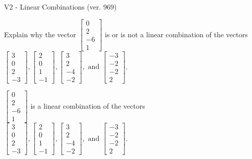\begin{exercise}
  \begin{exerciseTitle}V2 - Linear Combinations (ver. 969)\end{exerciseTitle}
  \begin{exerciseStatement}
    Explain why the vector \(\left[\begin{array}{c}
0 \\
2 \\
-6 \\
1
\end{array}\right]\)  is or is not a linear 
	combination of the vectors \(\left[\begin{array}{c}
3 \\
0 \\
2 \\
-3
\end{array}\right] , \left[\begin{array}{c}
2 \\
0 \\
1 \\
-1
\end{array}\right] , \left[\begin{array}{c}
3 \\
2 \\
-4 \\
-2
\end{array}\right] , \text{ and } \left[\begin{array}{c}
-3 \\
-2 \\
-2 \\
2
\end{array}\right]\).
	


  \end{exerciseStatement}
  \begin{exerciseAnswer}
   \(\left[\begin{array}{c}
0 \\
2 \\
-6 \\
1
\end{array}\right]\) 
  	 is  
	a linear combination of the vectors \(\left[\begin{array}{c}
3 \\
0 \\
2 \\
-3
\end{array}\right] , \left[\begin{array}{c}
2 \\
0 \\
1 \\
-1
\end{array}\right] , \left[\begin{array}{c}
3 \\
2 \\
-4 \\
-2
\end{array}\right] , \text{ and } \left[\begin{array}{c}
-3 \\
-2 \\
-2 \\
2
\end{array}\right]\).


\end{exerciseAnswer}
\end{exercise}

